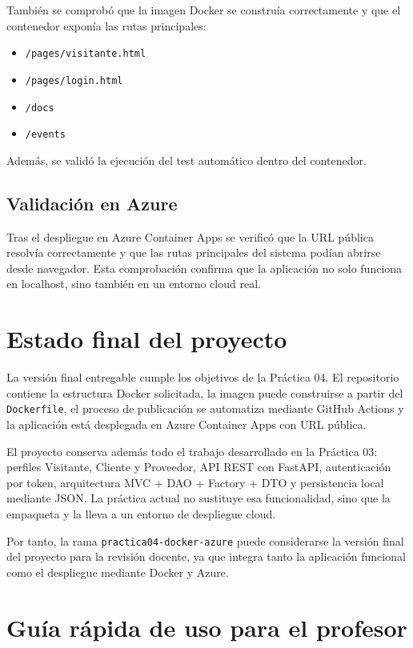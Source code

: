 \documentclass[11pt,a4paper]{article}
\begin{document}
Tambi\'en se comprob\'o que la imagen Docker se constru\'ia correctamente y que el contenedor expon\'ia las rutas principales:

\begin{itemize}
  \item \texttt{/pages/visitante.html}
  \item \texttt{/pages/login.html}
  \item \texttt{/docs}
  \item \texttt{/events}
\end{itemize}

Adem\'as, se valid\'o la ejecuci\'on del test autom\'atico dentro del contenedor.

\subsection{Validaci\'on en Azure}

Tras el despliegue en Azure Container Apps se verific\'o que la URL p\'ublica resolv\'ia correctamente y que las rutas principales del sistema pod\'ian abrirse desde navegador. Esta comprobaci\'on confirma que la aplicaci\'on no solo funciona en localhost, sino tambi\'en en un entorno cloud real.

\section{Estado final del proyecto}

La versi\'on final entregable cumple los objetivos de la Pr\'actica 04. El repositorio contiene la estructura Docker solicitada, la imagen puede construirse a partir del \texttt{Dockerfile}, el proceso de publicaci\'on se automatiza mediante GitHub Actions y la aplicaci\'on est\'a desplegada en Azure Container Apps con URL p\'ublica.

El proyecto conserva adem\'as todo el trabajo desarrollado en la Pr\'actica 03: perfiles Visitante, Cliente y Proveedor, API REST con FastAPI, autenticaci\'on por token, arquitectura MVC + DAO + Factory + DTO y persistencia local mediante JSON. La pr\'actica actual no sustituye esa funcionalidad, sino que la empaqueta y la lleva a un entorno de despliegue cloud.

Por tanto, la rama \texttt{practica04-docker-azure} puede considerarse la versi\'on final del proyecto para la revisi\'on docente, ya que integra tanto la aplicaci\'on funcional como el despliegue mediante Docker y Azure.

\section{Gu\'ia r\'apida de uso para el profesor}
\end{document}
